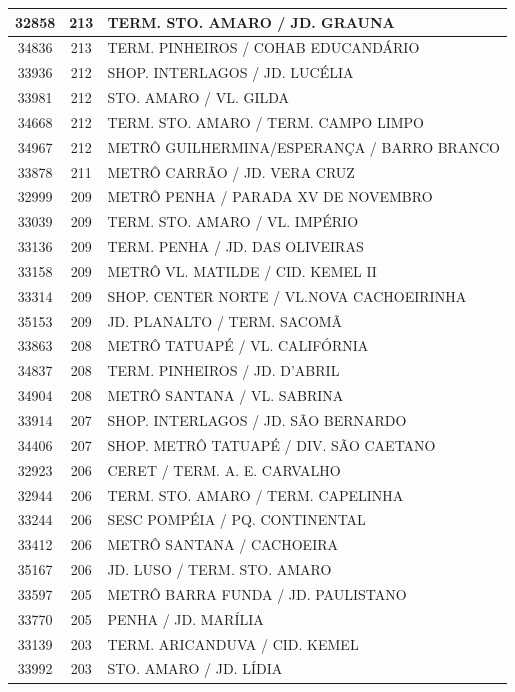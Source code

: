 \documentclass[
	12pt,				%
	oneside,			%
	a4paper,			%
	english,			%
	brazil				%
	]{abntex2ppgsi}
\begin{document}
{{\begin{apendicesenv}
\begin{longtable}{c|c|p{7cm}}
 \hline 
32858 &	213 &	TERM. STO. AMARO / JD. GRAUNA \\ 
 \hline 
34836 &	213 &	TERM. PINHEIROS / COHAB EDUCANDÁRIO \\ 
 \hline 
33936 &	212 &	SHOP. INTERLAGOS / JD. LUCÉLIA \\ 
 \hline 
33981 &	212 &	STO. AMARO / VL. GILDA \\ 
 \hline 
34668 &	212 &	TERM. STO. AMARO / TERM. CAMPO LIMPO \\ 
 \hline 
34967 &	212 &	METRÔ GUILHERMINA/ESPERANÇA / BARRO BRANCO \\ 
 \hline 
33878 &	211 &	METRÔ CARRÃO / JD. VERA CRUZ \\ 
 \hline 
32999 &	209 &	METRÔ PENHA / PARADA XV DE NOVEMBRO \\ 
 \hline 
33039 &	209 &	TERM. STO. AMARO / VL. IMPÉRIO \\ 
 \hline 
33136 &	209 &	TERM. PENHA / JD. DAS OLIVEIRAS \\ 
 \hline 
33158 &	209 &	METRÔ VL. MATILDE / CID. KEMEL II \\ 
 \hline 
33314 &	209 &	SHOP. CENTER NORTE / VL.NOVA CACHOEIRINHA \\ 
 \hline 
35153 &	209 &	JD. PLANALTO / TERM. SACOMÃ \\ 
 \hline 
33863 &	208 &	METRÔ TATUAPÉ / VL. CALIFÓRNIA \\ 
 \hline 
34837 &	208 &	TERM. PINHEIROS / JD. D'ABRIL \\ 
 \hline 
34904 &	208 &	METRÔ SANTANA / VL. SABRINA \\ 
 \hline 
33914 &	207 &	SHOP. INTERLAGOS / JD. SÃO BERNARDO \\ 
 \hline 
34406 &	207 &	SHOP. METRÔ TATUAPÉ / DIV. SÃO CAETANO \\ 
 \hline 
32923 &	206 &	CERET / TERM. A. E. CARVALHO \\ 
 \hline 
32944 &	206 &	TERM. STO. AMARO / TERM. CAPELINHA \\ 
 \hline 
33244 &	206 &	SESC POMPÉIA / PQ. CONTINENTAL \\ 
 \hline 
33412 &	206 &	METRÔ SANTANA / CACHOEIRA \\ 
 \hline 
35167 &	206 &	JD. LUSO / TERM. STO. AMARO \\ 
 \hline 
33597 &	205 &	METRÔ BARRA FUNDA / JD. PAULISTANO \\ 
 \hline 
33770 &	205 &	PENHA / JD. MARÍLIA \\ 
 \hline 
33139 &	203 &	TERM. ARICANDUVA / CID. KEMEL \\ 
 \hline 
33992 &	203 &	STO. AMARO / JD. LÍDIA \\ 

\end{longtable}
\end{apendicesenv}}}
\end{document}
